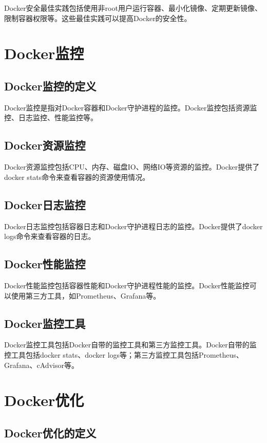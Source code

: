 \documentclass[12pt,UTF8]{ctexbook}
\begin{document}
Docker安全最佳实践包括使用非root用户运行容器、最小化镜像、定期更新镜像、限制容器权限等。这些最佳实践可以提高Docker的安全性。

\chapter{Docker监控}

\section{Docker监控的定义}

Docker监控是指对Docker容器和Docker守护进程的监控。Docker监控包括资源监控、日志监控、性能监控等。

\section{Docker资源监控}

Docker资源监控包括CPU、内存、磁盘IO、网络IO等资源的监控。Docker提供了docker stats命令来查看容器的资源使用情况。

\section{Docker日志监控}

Docker日志监控包括容器日志和Docker守护进程日志的监控。Docker提供了docker logs命令来查看容器的日志。

\section{Docker性能监控}

Docker性能监控包括容器性能和Docker守护进程性能的监控。Docker性能监控可以使用第三方工具，如Prometheus、Grafana等。

\section{Docker监控工具}

Docker监控工具包括Docker自带的监控工具和第三方监控工具。Docker自带的监控工具包括docker stats、docker logs等；第三方监控工具包括Prometheus、Grafana、cAdvisor等。

\chapter{Docker优化}

\section{Docker优化的定义}
\end{document}
